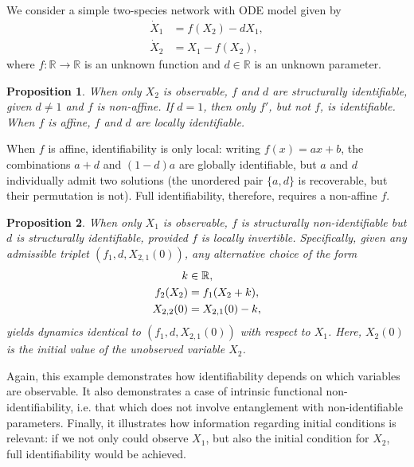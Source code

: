 \documentclass{article}
\theoremstyle{plain}
\newtheorem{proposition}{Proposition}[section]
\theoremstyle{definition}
\begin{document}
{We consider a simple two-species network with ODE model given by 
\begin{align}
    \dot{X}_1 &= f(X_2) - dX_1, \label{eq:chemical reaction network_dXdt} \\
    \dot{X}_2 &= X_1 - f(X_2), \label{eq:chemical reaction network_dYdt}
\end{align}
where $f:\mathbb{R}\to\mathbb{R}$ is an unknown function and $d\in\mathbb{R}$ is an unknown parameter. 

\begin{proposition} \label{prop:chemical reaction network}
When only $X_2$ is observable, $f$ and $d$ are structurally identifiable, given $d \neq 1$ and $f$ is non-affine. If $d = 1$, then only $f'$, but not $f$, is identifiable. When $f$ is affine, $f$ and $d$ are locally identifiable.
\end{proposition}

When $f$ is affine, identifiability is only local: writing $f(x) = ax + b$, the combinations $a + d$ and $(1-d)a$ are globally identifiable, but $a$ and $d$ individually admit two solutions (the unordered pair $\{a, d\}$ is recoverable, but their permutation is not). Full identifiability, therefore, requires a non-affine $f$.

\begin{proposition} \label{prop:chemical reaction network_Xobs}
When only $X_1$ is observable, $f$ is structurally non-identifiable but $d$ is structurally identifiable, provided $f$ is locally invertible. Specifically, given any admissible triplet $(f_1, d, X_{2,1}(0))$, any alternative choice of the form
\begin{align}
    \label{eq:chemical reaction network_Xobs_nonident_expr}
    k&\in\mathbb{R}, \notag \\
    f_2(X_2) &= f_1(X_2 + k), \notag \\
    X_{2,2}(0) &= X_{2,1}(0) - k,
\end{align}
yields dynamics identical to $(f_1, d, X_{2,1}(0))$ with respect to $X_1$. Here, $X_2(0)$ is the initial value of the unobserved variable $X_2$.
\end{proposition}

Again, this example demonstrates how identifiability depends on which variables are observable. It also demonstrates a case of intrinsic functional non-identifiability, i.e. that which does not involve entanglement with non-identifiable parameters. Finally, it illustrates how information regarding initial conditions is relevant: if we not only could observe $X_1$, but also the initial condition for  $X_2$, full identifiability would be achieved.

}
\end{document}
